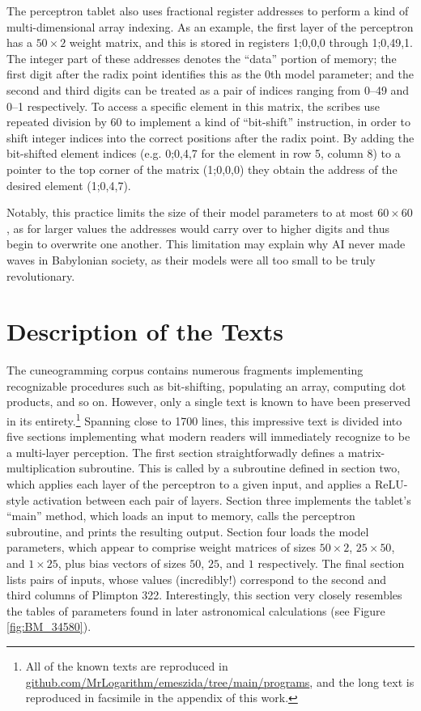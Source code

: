 \documentclass[11pt]{article}
\begin{document}
The perceptron tablet also uses fractional register addresses to perform a kind of multi-dimensional array indexing.
As an example, the first layer of the perceptron has a $50\times 2$ weight matrix, and this is stored in registers 1;0,0,0 through 1;0,49,1. The integer part of these addresses denotes the ``data'' portion of memory; the first digit after the radix point identifies this as the 0th model parameter; and the second and third digits can be treated as a pair of indices ranging from 0--49 and 0--1 respectively.
To access a specific element in this matrix, the scribes use repeated division by 60 to implement a kind of ``bit-shift'' instruction, in order to shift integer indices into the correct positions after the radix point. 
By adding the bit-shifted element indices (e.g. 0;0,4,7 for the element in row 5, column 8) to a pointer to the top corner of the matrix (1;0,0,0) they obtain the address of the desired element (1;0,4,7).

Notably, this practice limits the size of their model parameters to at most $60\times 60$, as for larger values the addresses would carry over to higher digits and thus begin to overwrite one another. 
This limitation may explain why AI never made waves in Babylonian society, as their models were all too small to be truly revolutionary.

\section{Description of the Texts}
The cuneogramming corpus contains numerous fragments implementing recognizable procedures such as bit-shifting, populating an array, computing dot products, and so on. 
However, only a single text is known to have been preserved in its entirety.\footnote{All of the known texts are reproduced in \url{github.com/MrLogarithm/emeszida/tree/main/programs}, and the long text is reproduced in facsimile in the appendix of this work.}
Spanning close to 1700 lines, this impressive text is divided into five sections implementing what modern readers will immediately recognize to be a multi-layer perception.
The first section straightforwadly defines a matrix-multiplication subroutine. 
This is called by a subroutine defined in section two, which applies each layer of the perceptron to a given input, and applies a ReLU-style activation between each pair of layers.
Section three implements the tablet's ``main'' method, which loads an input to memory, calls the perceptron subroutine, and prints the resulting output.
Section four loads the model parameters, which appear to comprise weight matrices of sizes $50\times 2$, $25\times 50$, and $1\times 25$, plus bias vectors of sizes $50$, $25$, and $1$ respectively.
The final section lists pairs of inputs, whose values (incredibly!) correspond to the second and third columns of Plimpton 322.
Interestingly, this section very closely resembles the tables of parameters found in later astronomical calculations (see Figure \ref{fig:BM_34580}).
\end{document}
